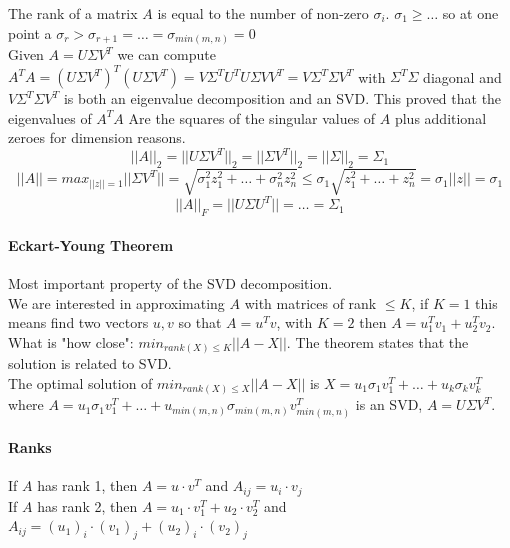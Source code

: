 \documentclass[10pt]{report}
\begin{document}
The rank of a matrix $A$ is equal to the number of non-zero $\sigma_i$. $\sigma_1\geq \ldots$ so at one point a $\sigma_r > \sigma_{r+1} = \ldots = \sigma_{min(m,n)} = 0$\\
Given $A = U\Sigma V^T$ we can compute $A^T A = (U\Sigma V^T)^T(U\Sigma V^T) = V\Sigma^T U^T U \Sigma VV^T = V\Sigma^T \Sigma V^T$ with $\Sigma^T \Sigma$ diagonal and $V\Sigma^T \Sigma V^T$ is both an eigenvalue decomposition and an SVD. This proved that the eigenvalues of $A^T A$ Are the squares of the singular values of $A$ plus additional zeroes for dimension reasons.
$$||A||_2 = ||U\Sigma V^T||_2 = ||\Sigma V^T||_2 = ||\Sigma||_2 = \Sigma_1$$
$$||A|| = max_{||z|| = 1} ||\Sigma V^T|| = \sqrt{\sigma_1^2 z_1^2 + \ldots + \sigma_n^2 z_n^2} \leq \sigma_1 \sqrt{z_1^2 +\ldots + z_n^2} = \sigma_1||z|| = \sigma_1$$
$$||A||_F = ||U\Sigma U^T|| = \ldots = \Sigma_1$$
\paragraph{Eckart-Young Theorem} Most important property of the SVD decomposition.\\
We are interested in approximating $A$ with matrices of rank $\leq K$, if $K = 1$ this means find two vectors $u, v$ so that $A = u^T v$, with $K=2$ then $A = u_1^T v_1 + u_2^T v_2$. What is "how close": $min_{rank(X) \leq K}||A - X||$. The theorem states that the solution is related to SVD.\\
The optimal solution of $min_{rank(X) \leq X}||A - X||$ is $X = u_1\sigma_1 v_1^T + \ldots + u_k\sigma_k v_k^T$\\where $A = u_1\sigma_1 v_1^T + \ldots + u_{min(m,n)}\sigma_{min(m,n)} v_{min(m,n)}^T$ is an SVD, $A = U\Sigma V^T$.
\paragraph{Ranks} If $A$ has rank 1, then $A = u\cdot v^T$ and $A_{ij} = u_i\cdot v_j$\\
If $A$ has rank 2, then $A= u_1\cdot v_1^T + u_2\cdot v_2^T$ and $A_{ij} = (u_1)_i\cdot (v_1)_j + (u_2)_i\cdot (v_2)_j$
\end{document}
